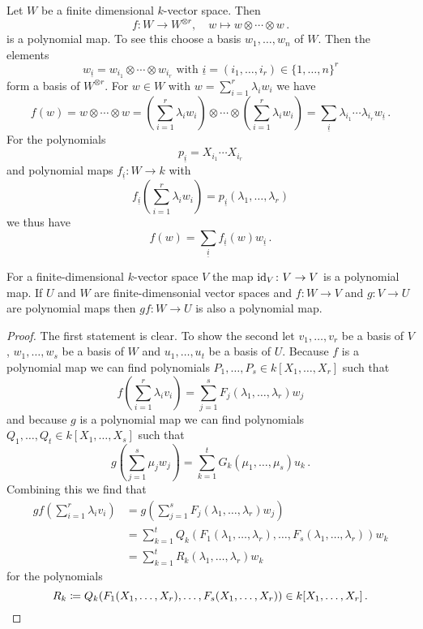\begin{example}
  Let $W$ be a finite dimensional $k$-vector space. Then
  \[
            f
    \colon  W
    \to     W^{\otimes r},
    \quad   w
    \mapsto w \otimes \dotsb \otimes w \,.
  \]
  is a polynomial map.
  To see this choose a basis $w_1, \dotsc, w_n$ of $W$. Then the elements
  \[
      w_{\underline{i}}
    = w_{i_1} \otimes \dotsb \otimes w_{i_r}
    \text{ with }
        \underline{i}
    =   (i_1, \dotsc, i_r)
    \in \{1, \dotsc, n\}^r
  \]
  form a basis of $W^{\otimes r}$.
  For $w \in W$ with $w = \sum_{i=1}^r \lambda_i w_i$ we have
  \[
      f(w)
    = w \otimes \dotsb \otimes w
    =         \left( \sum_{i=1}^r \lambda_i w_i \right)
      \otimes \dotsb
      \otimes \left( \sum_{i=1}^r \lambda_i w_i \right)
    = \sum_{\underline{i}} \lambda_{i_1} \dotsm \lambda_{i_r} w_{\underline{i}} \,.
  \]
  For the polynomials
  \[
      p_{\underline{i}}
    = X_{i_1} \dotsm X_{i_r}
  \]
  and polynomial maps $f_{\underline{i}} \colon W \to k$ with
  \[
      f_{\underline{i}}\left( \sum_{i=1}^r \lambda_i w_i \right)
    = p_{\underline{i}}(\lambda_1, \dotsc, \lambda_r)
  \]
  we thus have
  \[
      f(w)
    = \sum_{\underline{i}} f_{\underline{i}}(w) w_{\underline{i}} \,.
  \]
\end{example}


\begin{lemma}
  For a finite-dimensional $k$-vector space $V$ the map $\operatorname{id}_V \colon V \to V$ is a polynomial map.
  If $U$ and $W$ are finite-dimensonial vector spaces and $f \colon W \to V$ and $g \colon V \to U$ are polynomial maps then $gf \colon W \to U$ is also a polynomial map.
\end{lemma}
\begin{proof}
  The first statement is clear.
  To show the second let $v_1, \dotsc, v_r$ be a basis of $V$, $w_1, \dotsc, w_s$ be a basis of $W$ and $u_1, \dotsc, u_t$ be a basis of $U$.
  Because $f$ is a polynomial map we can find polynomials $P_1, \dotsc, P_s \in k[X_1, \dotsc, X_r]$ such that
  \[
      f\left( \sum_{i=1}^r \lambda_i v_i \right)
    = \sum_{j=1}^s F_j(\lambda_1, \dotsc, \lambda_r) w_j
  \]
  and because $g$ is a polynomial map we can find polynomials $Q_1, \dotsc, Q_t \in k[X_1, \dotsc, X_s]$ such that
  \[
      g\left( \sum_{j=1}^s \mu_j w_j \right)
    = \sum_{k=1}^t G_k(\mu_1, \dotsc, \mu_s) u_k \,.
  \]
  Combining this we find that
  \begin{align*}
        gf\left( \sum_{i=1}^r \lambda_i v_i \right)
    &=  g\left( \sum_{j=1}^s F_j(\lambda_1, \dotsc, \lambda_r) w_j \right) \\
    &=  \sum_{k=1}^t Q_k(F_1(\lambda_1, \dotsc, \lambda_r), \dotsc, F_s(\lambda_1, \dotsc, \lambda_r)) w_k \\
    &=  \sum_{k=1}^t R_k(\lambda_1, \dotsc, \lambda_r) w_k
  \end{align*}
  for the polynomials
  \[
              R_k
    \coloneqq Q_k(F_1(X_1, \dotsc, X_r), \dotsc, F_s(X_1, \dotsc, X_r))
    \in       k[X_1, \dotsc, X_r] \,.
    \qedhere
  \]
\end{proof}


